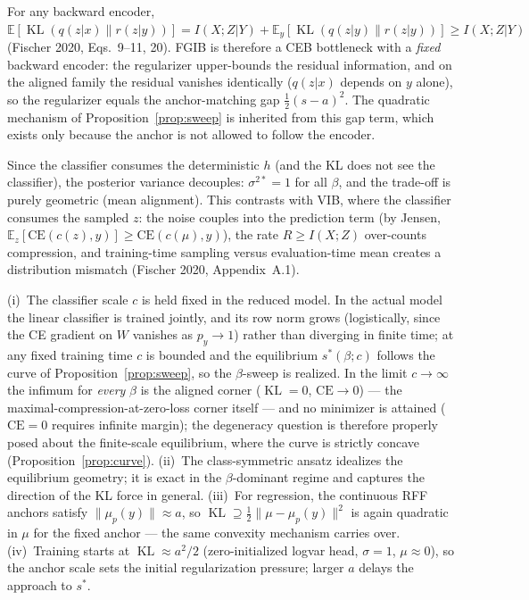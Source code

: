 \begin{remark}\label{rem:residual}
For any backward encoder, $\mathbb{E}[\operatorname{KL}(q(z|x)\|r(z|y))]
= I(X;Z|Y) + \mathbb{E}_y[\operatorname{KL}(q(z|y)\|r(z|y))]
\ge I(X;Z|Y)$ (Fischer 2020, Eqs.~9--11, 20). FGIB is therefore a CEB bottleneck with a
\emph{fixed} backward encoder: the regularizer upper-bounds the residual information, and on
the aligned family the residual vanishes identically ($q(z|x)$ depends on $y$ alone), so the
regularizer equals the anchor-matching gap $\tfrac{1}{2}(s-a)^2$. The quadratic mechanism of
Proposition~\ref{prop:sweep} is inherited from this gap term, which exists only because the
anchor is not allowed to follow the encoder.
\end{remark}

\begin{remark}
Since the classifier consumes the deterministic $h$ (and the KL does not see the classifier),
the posterior variance decouples: $\sigma^{2*} = 1$ for all $\beta$, and the trade-off is
purely geometric (mean alignment). This contrasts with VIB, where the classifier consumes
the sampled $z$: the noise couples into the prediction term (by Jensen,
$\mathbb{E}_z[\mathrm{CE}(c(z),y)] \ge \mathrm{CE}(c(\mu),y)$), the rate $R \ge I(X;Z)$
over-counts compression, and training-time sampling versus evaluation-time mean creates a
distribution mismatch (Fischer 2020, Appendix~A.1).
\end{remark}

\begin{remark}\label{rem:caveats}
(i)~The classifier scale $c$ is held fixed in the reduced model. In the actual model the
linear classifier is trained jointly, and its row norm grows (logistically, since the CE
gradient on $W$ vanishes as $p_y \to 1$) rather than diverging in finite time; at any fixed
training time $c$ is bounded and the equilibrium $s^*(\beta; c)$ follows the curve of
Proposition~\ref{prop:sweep}, so the $\beta$-sweep is realized. In the limit $c \to \infty$
the infimum for \emph{every} $\beta$ is the aligned corner ($\operatorname{KL} = 0$,
$\mathrm{CE} \to 0$) --- the maximal-compression-at-zero-loss corner itself --- and no
minimizer is attained ($\mathrm{CE} = 0$ requires infinite margin); the degeneracy question
is therefore properly posed about the finite-scale equilibrium, where the curve is strictly
concave (Proposition~\ref{prop:curve}). (ii)~The class-symmetric ansatz idealizes the
equilibrium geometry; it is exact in the $\beta$-dominant regime and captures the direction
of the KL force in general. (iii)~For regression, the continuous RFF anchors satisfy
$\|\mu_p(y)\| \approx a$, so $\operatorname{KL} \supseteq \tfrac{1}{2}\|\mu - \mu_p(y)\|^2$
is again quadratic in $\mu$ for the fixed anchor --- the same convexity mechanism carries
over. (iv)~Training starts at $\operatorname{KL} \approx a^2/2$ (zero-initialized logvar
head, $\sigma = 1$, $\mu \approx 0$), so the anchor scale sets the initial regularization
pressure; larger $a$ delays the approach to $s^*$.
\end{remark}
